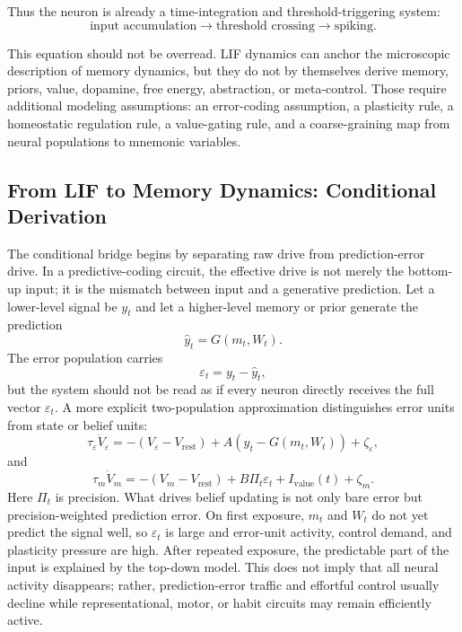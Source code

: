 \documentclass[11pt, a4paper]{article}
\begin{document}
Thus the neuron is already a time-integration and threshold-triggering system:
\begin{equation}
\text{input accumulation}
\rightarrow
\text{threshold crossing}
\rightarrow
\text{spiking}.
\end{equation}

This equation should not be overread. LIF dynamics can anchor the microscopic description of memory dynamics, but they do not by themselves derive memory, priors, value, dopamine, free energy, abstraction, or meta-control. Those require additional modeling assumptions: an error-coding assumption, a plasticity rule, a homeostatic regulation rule, a value-gating rule, and a coarse-graining map from neural populations to mnemonic variables.

\subsection{From LIF to Memory Dynamics: Conditional Derivation}

The conditional bridge begins by separating raw drive from prediction-error drive. In a predictive-coding circuit, the effective drive is not merely the bottom-up input; it is the mismatch between input and a generative prediction. Let a lower-level signal be $y_t$ and let a higher-level memory or prior generate the prediction
\begin{equation}
\hat y_t
=
G(m_t,W_t).
\end{equation}
The error population carries
\begin{equation}
\varepsilon_t
=
y_t-\hat y_t,
\end{equation}
but the system should not be read as if every neuron directly receives the full vector $\varepsilon_t$. A more explicit two-population approximation distinguishes error units from state or belief units:
\begin{equation}
\tau_\varepsilon \dot V_\varepsilon
=
-(V_\varepsilon-V_{\mathrm{rest}})
+
A\left(y_t-G(m_t,W_t)\right)
+
\zeta_\varepsilon,
\end{equation}
and
\begin{equation}
\tau_m \dot V_m
=
-(V_m-V_{\mathrm{rest}})
+
B\Pi_t\varepsilon_t
+
I_{\mathrm{value}}(t)
+
\zeta_m.
\end{equation}
Here $\Pi_t$ is precision. What drives belief updating is not only bare error but precision-weighted prediction error. On first exposure, $m_t$ and $W_t$ do not yet predict the signal well, so $\varepsilon_t$ is large and error-unit activity, control demand, and plasticity pressure are high. After repeated exposure, the predictable part of the input is explained by the top-down model. This does not imply that all neural activity disappears; rather, prediction-error traffic and effortful control usually decline while representational, motor, or habit circuits may remain efficiently active.
\end{document}
